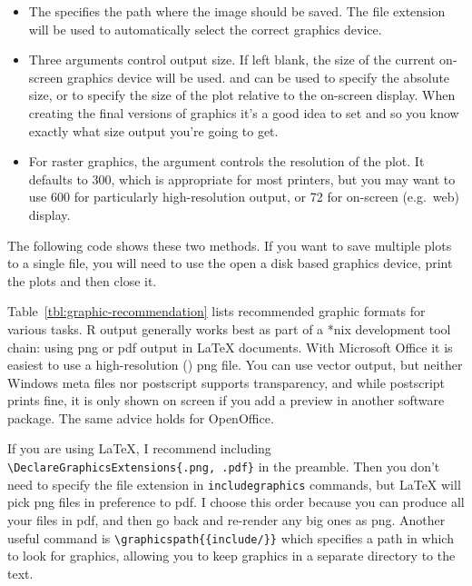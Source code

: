 \begin{itemize}
  \item The  specifies the path where the image should be saved.  The file extension will be used to automatically select the correct graphics device.
  
  \item Three arguments control output size.  If left blank, the size of the current on-screen graphics device will be used.   and  can be used to specify the absolute size, or  to specify the size of the plot relative to the on-screen display.  When creating the final versions of graphics it's a good idea to set  and  so you know exactly what size output you're going to get.

  \item For raster graphics, the  argument controls the resolution of the plot. It defaults to 300, which is appropriate for most printers, but you may want to use 600 for particularly high-resolution output, or 72 for on-screen (e.g.\ web) display.
  
\end{itemize}

The following code shows these two methods. If you want to save multiple plots to a single file, you will need to use the open a disk based graphics device, print the plots and then close it.

% 
% 


Table~\ref{tbl:graphic-recommendation} lists recommended graphic formats for various tasks.  R output generally works best as part of a *nix development tool chain: using png or pdf output in \LaTeX{} documents.  With Microsoft Office it is easiest to use a high-resolution () png file.  You can use vector output, but neither Windows meta files nor postscript supports transparency, and while postscript prints fine, it is only shown on screen if you add a preview in another software package.  The same advice holds for OpenOffice.

If you are using \LaTeX, I recommend including \verb|\DeclareGraphicsExtensions{.png, .pdf}| in the preamble.  Then you don't need to specify the file extension in \verb|includegraphics| commands, but \LaTeX{} will pick png files in preference to pdf.  I choose this order because you can produce all your files in pdf, and then go back and re-render any big ones as png.  Another useful command is \verb|\graphicspath{{include/}}| which specifies a path in which to look for graphics, allowing you to keep graphics in a separate directory to the text.

